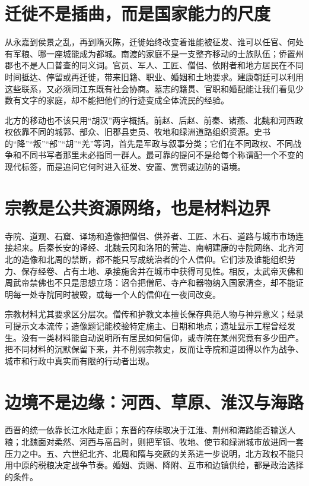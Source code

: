 \section{迁徙不是插曲，而是国家能力的尺度}
\label{sec:synthesis-migration}

从永嘉到侯景之乱，再到隋灭陈，迁徙始终改变着谁能被征发、谁可以任官、何处有军粮、哪一座城能成为都城。南渡的家庭不是一支整齐移动的士族队伍；侨置州郡也不是人口普查的同义词。官员、军人、工匠、僧侣、依附者和地方居民在不同时间抵达、停留或再迁徙，带来旧籍、职业、婚姻和土地要求。建康朝廷可以利用这些联系，又必须同江东既有社会协商。墓志的籍贯、官职和婚配能让我们看见少数有文字的家庭，却不能把他们的行迹变成全体流民的经验。

北方的移动也不该只用“胡汉”两字概括。前赵、后赵、前秦、诸燕、北魏和河西政权依靠不同的城郭、部众、旧郡县吏员、牧地和绿洲道路组织资源。史书的“降”“叛”“部”“胡”“羌”等词，首先是军政与叙事分类；它们在不同政权、不同战争和不同书写者那里未必指同一群人。最可靠的提问不是给每个称谓配一个不变的现代标签，而是追问它何时进入征发、安置、赏罚或边防的语境。

\section{宗教是公共资源网络，也是材料边界}
\label{sec:synthesis-religion}

寺院、道观、石窟、译场和造像把僧侣、供养者、工匠、木石、道路与城市市场连接起来。后秦长安的译经、北魏云冈和洛阳的营造、南朝建康的寺院网络、北齐河北的造像和北周的禁断，都不能只写成统治者的个人信仰。它们涉及谁能组织劳力、保存经卷、占有土地、承接施舍并在城市中获得可见性。相反，太武帝灭佛和周武帝禁佛也不只是思想立场：诏令把僧尼、寺产和器物纳入国家清查，却不能证明每一处寺院同时被毁，或每一个人的信仰在一夜间改变。

宗教材料尤其要求区分层次。僧传和护教文本擅长保存典范人物与神异意义；经录可提示文本流传；造像题记能校验特定施主、日期和地点；遗址显示工程曾经发生。没有一类材料能自动说明所有居民如何信仰，或寺院在某州究竟有多少田产。把不同材料的沉默保留下来，并不削弱宗教史，反而让寺院和道团得以作为战争、城市和行政中真实而有限的行动者出现。

\section{边境不是边缘：河西、草原、淮汉与海路}
\label{sec:synthesis-frontier}

西晋的统一依靠长江水陆走廊；东晋的存续取决于江淮、荆州和海路能否输送人粮；北魏面对柔然、河西与高昌时，则把军镇、牧地、使节和绿洲城市放进同一套压力之中。五、六世纪北齐、北周和隋与突厥的关系进一步说明，北方政权不能只用中原的税粮决定战争节奏。婚姻、贡赐、降附、互市和边镇供给，都是政治选择的条件。

